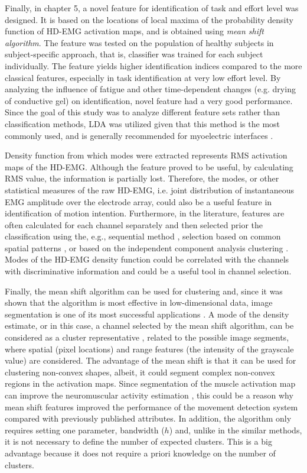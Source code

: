 Finally, in chapter 5, a novel feature for identification of task and effort level was designed. It is based on the locations of local maxima of the probability density function of HD-EMG activation maps, and is obtained using \emph{mean shift algorithm}. The feature was tested on the population of healthy subjects in subject-specific approach, that is, classifier was trained for each subject individually. The feature yields higher identification indices compared to the more classical features, especially in task identification at very low effort level. By analyzing the influence of fatigue and other time-dependent changes (e.g. drying of conductive gel) on identification, novel feature had a very good performance. Since the goal of this study was to analyze different feature sets rather than classification methods, LDA was utilized given that this method is the most commonly used, and is generally recommended for myoelectric interfaces \citep{Hakonen2015}.

Density function from which modes were extracted represents RMS activation maps of the HD-EMG. Although the feature proved to be useful, by calculating RMS value, the information is partially lost. Therefore, the modes, or other statistical measures of the raw HD-EMG, i.e. joint distribution of instantaneous EMG amplitude over the electrode array, could also be a useful feature in identification of motion intention. Furthermore, in the literature, features are often calculated for each channel separately and then selected prior the classification using the, e.g., sequential method \citep{Hargrove2009, Li2017}, selection based on common spatial patterns \citep{Geng2014}, or based on the independent component analysis clustering \citep{Naik2016}. Modes of the HD-EMG density function could be correlated with the channels with discriminative information and could be a useful tool in channel selection.

Finally, the mean shift algorithm can be used for clustering and, since it was shown that the algorithm is most effective in low-dimensional data, image segmentation is one of its most successful applications \citep{Comaniciu2002}. A mode of the density estimate, or in this case, a channel selected by the mean shift algorithm, can be considered as a cluster representative \citep{Hennig2015}, related to the possible image segments, where spatial (pixel locations) and range features (the intensity of the grayscale value) are considered. The advantage of the mean shift is that it can be used for clustering non-convex shapes, albeit, it could segment complex non-convex regions in the activation maps. Since segmentation of the muscle activation map can improve the neuromuscular activity estimation \citep{Vieira2010}, this could be a reason why mean shift features improved the performance of the movement detection system compared with previously published attributes. In addition, the algorithm only requires setting one parameter, bandwidth ($h$) and, unlike in the similar methods, it is not necessary to define the number of expected clusters. This is a big advantage because it does not require a priori knowledge on the number of clusters.

